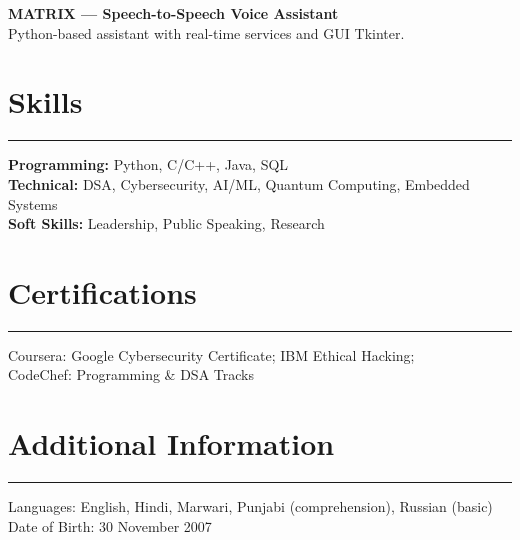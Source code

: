 \documentclass[11pt,a4paper]{article}
\newcommand{\resumesection}[1]{
  \section*{#1}
  \vspace{-4pt}
  \hrule
  \vspace{5pt}
}
\begin{document}
\begin{tcolorbox}[resumebox]
\textbf{MATRIX — Speech-to-Speech Voice Assistant}\\
Python-based assistant with real-time services and GUI {Tkinter}.
\end{tcolorbox}

\resumesection{Skills}
\textbf{Programming:} Python, C/C++, Java, SQL\\
\textbf{Technical:} DSA, Cybersecurity, AI/ML, Quantum Computing, Embedded Systems\\
\textbf{Soft Skills:} Leadership, Public Speaking, Research

\resumesection{Certifications}
Coursera: Google Cybersecurity Certificate; IBM Ethical Hacking; \\ CodeChef: Programming \& DSA Tracks

\resumesection{Additional Information}
Languages: English, Hindi, Marwari, Punjabi (comprehension), Russian (basic)\\
Date of Birth: 30 November 2007
\end{document}
